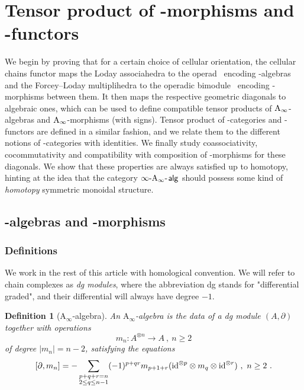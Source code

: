 \documentclass[twoside, 11pt]{amsart}
\newtheorem{definition}{Definition}[section]
\theoremstyle{remark}
\begin{document}

\section{Tensor product of \Ainf -morphisms and \Ainf -functors}
\label{sec:IV}

We begin by proving that for a certain choice of cellular orientation, the cellular chains functor maps the Loday associahedra to the operad \Ainf\ encoding \Ainf -algebras and the Forcey--Loday multiplihedra to the operadic bimodule \Minf\ encoding \Ainf -morphisms between them.
It then maps the respective geometric diagonals to algebraic ones, which can be used to define compatible tensor products of $\mathrm{A}_\infty$-algebras and $\mathrm{A}_\infty$-morphisms (with signs). 
Tensor product of \Ainf -categories and \Ainf -functors are defined in a similar fashion, and we relate them to the different notions of \Ainf -categories with identities.
We finally study coassociativity, cocommutativity and compatibility with composition of \Ainf -morphisms for these diagonals. 
We show that these properties are always satisfied up to homotopy, hinting at the idea that the category $\infty\text{-}\mathrm{A}_\infty\text{-\hspace{1pt}}\mathsf{alg}$ should possess some kind of \textit{homotopy} symmetric monoidal structure.

\subsection{\Ainf -algebras and \Ainf -morphisms} \label{ss:ainf-alg-ainf-morph}

\subsubsection{Definitions}

We work in the rest of this article with homological convention. 
We will refer to chain complexes as \emph{dg modules}, where the abbreviation dg stands for "differential graded", and their differential will always have degree $-1$.

\begin{definition}[$\mathrm{A}_\infty$-algebra] \label{def:ainf-alg} An \emph{$\mathrm{A}_\infty$-algebra} is the data of a dg module $(A,\partial)$ together with operations \[ m_n : A^{\otimes n} \to A \ , \ n \geq 2 \] of degree $|m_n|=n-2$, satisfying the equations 
\[ [ \partial , m_n ] = - \sum_{\substack{p+q+r=n \\ 2 \leq q \leq n-1}} (-1)^{p+qr}m_{p+1+r}(\mathrm{id}^{\otimes p} \otimes m_q \otimes \mathrm{id}^{\otimes r}) \ , \ n\geq 2 \ . \]
\end{definition}
\end{document}
